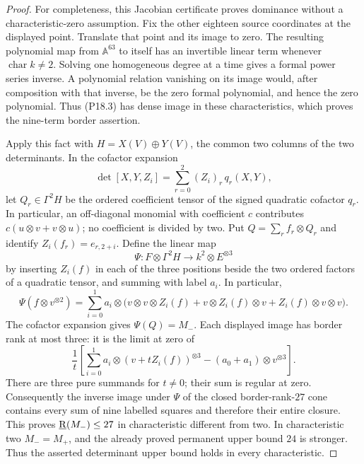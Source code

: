 \begin{proof}
For completeness, this Jacobian certificate proves
dominance without a characteristic-zero assumption.
Fix the other eighteen source coordinates at the
displayed point. Translate that point and its image
to zero. The resulting polynomial map from $\mathbb A^{63}$
to itself has an invertible linear term whenever
$\operatorname{char}k\ne2$. Solving one homogeneous
degree at a time gives a formal power series inverse.
A polynomial relation vanishing on its image would,
after composition with that inverse, be the zero
formal polynomial, and hence the zero polynomial.
Thus (P18.3) has dense image in these characteristics,
which proves the nine-term border assertion.

Apply this fact with $H=X(V)\oplus Y(V)$, the common
two columns of the two determinants. In the cofactor
expansion
\[
 \det[X,Y,Z_i]=\sum_{r=0}^2 (Z_i)_r\,q_r(X,Y),
\]
let $Q_r\in\Gamma^2H$ be the ordered coefficient tensor
of the signed quadratic cofactor $q_r$. In particular,
an off-diagonal monomial with coefficient $c$ contributes
$c(u\otimes v+v\otimes u)$; no coefficient is divided
by two. Put $Q=\sum_r f_r\otimes Q_r$ and identify
$Z_i(f_r)=e_{r,2+i}$. Define the linear map
\[
 \Psi:F\otimes\Gamma^2H\longrightarrow k^2\otimes E^{\otimes3}
\]
by inserting $Z_i(f)$ in each of the three positions
beside the two ordered factors of a quadratic tensor,
and summing with label $a_i$. In particular,
\[
 \Psi(f\otimes v^{\otimes2})=
 \sum_{i=0}^1a_i\otimes
 \bigl(v\otimes v\otimes Z_i(f)+v\otimes Z_i(f)\otimes v
                 +Z_i(f)\otimes v\otimes v\bigr).
\]
The cofactor expansion gives $\Psi(Q)=M_-$. Each
displayed image has border rank at most three: it
is the limit at zero of
\[
 \frac1t\left[\sum_{i=0}^1a_i\otimes
       (v+tZ_i(f))^{\otimes3}
       -(a_0+a_1)\otimes v^{\otimes3}\right].
 \tag{P18.4}
\]
There are three pure summands for $t\ne0$; their sum
is regular at zero. Consequently the inverse image
under $\Psi$ of the closed border-rank-$27$ cone
contains every sum of nine labelled squares and
therefore their entire closure. This proves
$\underline{\mathrm R}(M_-)\leq27$ in characteristic different from two.
In characteristic two $M_-=M_+$, and the already
proved permanent upper bound $24$ is stronger. Thus
the asserted determinant upper bound holds in every
characteristic.


\end{proof}
